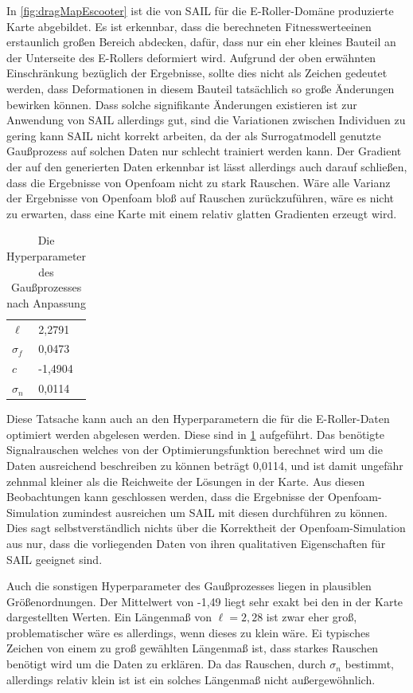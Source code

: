 In \cref{fig:dragMapEscooter} ist die von SAIL für die E-Roller-Domäne produzierte Karte abgebildet.
Es ist erkennbar, dass die berechneten Fitnesswerteeinen erstaunlich großen Bereich abdecken, dafür, dass nur ein eher kleines Bauteil an der Unterseite des E-Rollers deformiert wird.
Aufgrund der oben erwähnten Einschränkung bezüglich der Ergebnisse, sollte dies nicht als Zeichen gedeutet werden, dass Deformationen in diesem Bauteil tatsächlich so große Änderungen bewirken können.
Dass solche signifikante Änderungen existieren ist zur Anwendung von SAIL allerdings gut, sind die Variationen zwischen Individuen zu gering kann SAIL nicht korrekt arbeiten, da der als Surrogatmodell genutzte Gaußprozess auf solchen Daten nur schlecht trainiert werden kann.
Der Gradient der auf den generierten Daten erkennbar ist lässt allerdings auch darauf schließen, dass die Ergebnisse von Openfoam nicht zu stark Rauschen.
Wäre alle Varianz der Ergebnisse von Openfoam bloß auf Rauschen zurückzuführen, wäre es nicht zu erwarten, dass eine Karte mit einem relativ glatten Gradienten erzeugt wird.
\begin{table}[h]
	\centering
	\begin{tabularx}{.25\textwidth}{ll}\hline
		$\ell$ & 2,2791 \\
		$\sigma_f$ & 0,0473 \\
		$c$ & -1,4904 \\
		$\sigma_n$ & 0,0114 \\
	\end{tabularx}
	\label{tab:hyperparamsEscooter}
	\caption{Die Hyperparameter des Gaußprozesses nach Anpassung}
\end{table}
Diese Tatsache kann auch an den Hyperparametern die für die E-Roller-Daten optimiert werden abgelesen werden.
Diese sind in \cref{tab:hyperparamsEscooter} aufgeführt.
Das benötigte Signalrauschen welches von der Optimierungsfunktion berechnet wird um die Daten ausreichend beschreiben zu können beträgt 0,0114, und ist damit ungefähr zehnmal kleiner als die Reichweite der Lösungen in der Karte.
Aus diesen Beobachtungen kann geschlossen werden, dass die Ergebnisse der Openfoam-Simulation zumindest ausreichen um SAIL mit diesen durchführen zu können.
Dies sagt selbstverständlich nichts über die Korrektheit der Openfoam-Simulation aus nur, dass die vorliegenden Daten von ihren qualitativen Eigenschaften für SAIL geeignet sind.

Auch die sonstigen Hyperparameter des Gaußprozesses liegen in plausiblen Größenordnungen.
Der Mittelwert von -1,49 liegt sehr exakt bei den in der Karte dargestellten Werten.
Ein Längenmaß von $\ell=2,28$ ist zwar eher groß, problematischer wäre es allerdings, wenn dieses zu klein wäre.
Ei typisches Zeichen von einem zu groß gewählten Längenmaß ist, dass starkes Rauschen benötigt wird um die Daten zu erklären.
Da das Rauschen, durch $\sigma_n$ bestimmt, allerdings relativ klein ist ist ein solches Längenmaß nicht außergewöhnlich.

